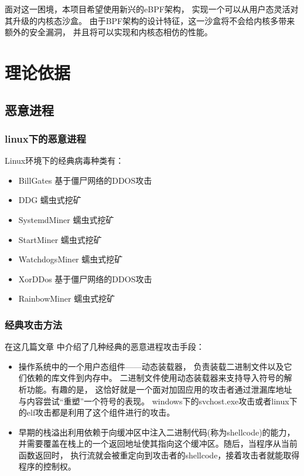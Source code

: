 \documentclass[AutoFakeBold,a4paper]{ctexart}
\begin{document}
面对这一困境，本项目希望使用新兴的eBPF架构，
实现一个可以从用户态灵活对其升级的内核态沙盒。
由于BPF架构的设计特征，这一沙盒将不会给内核多带来额外的安全漏洞，
并且将可以实现和内核态相仿的性能。

\section{理论依据}

\subsection{恶意进程}

\subsubsection{linux下的恶意进程}

Linux环境下的经典病毒种类有：\cite{LinuxVirus2020}

\begin{itemize}
    \item BillGates 基于僵尸网络的DDOS攻击
    \item DDG 蠕虫式挖矿
    \item SystemdMiner 蠕虫式挖矿
    \item StartMiner 蠕虫式挖矿
    \item WatchdogsMiner 蠕虫式挖矿
    \item XorDDos 基于僵尸网络的DDOS攻击
    \item RainbowMiner 蠕虫式挖矿
\end{itemize}


\subsubsection{经典攻击方法}

在这几篇文章\cite{di2015elf} \cite{rieck2008learning}中介绍了几种经典的恶意进程攻击手段：

\begin{itemize}
    \item 操作系统中的一个用户态组件——动态装载器，
    负责装载二进制文件以及它们依赖的库文件到内存中。
    二进制文件使用动态装载器来支持导入符号的解析功能。有趣的是，
    这恰好就是一个面对加固应用的攻击者通过泄漏库地址与内容尝试“重塑”一个符号的表现。
    windows下的svchost.exe攻击或者linux下的elf攻击都是利用了这个组件进行的攻击。
    \item 早期的栈溢出利用依赖于向缓冲区中注入二进制代码(称为shellcode)的能力，
    并需要覆盖在栈上的一个返回地址使其指向这个缓冲区。随后，当程序从当前函数返回时，
    执行流就会被重定向到攻击者的shellcode，接着攻击者就能取得程序的控制权。
    
\end{itemize}
\end{document}
